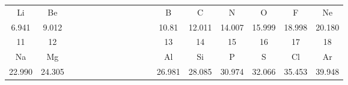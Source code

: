 \begin{tcolorbox}[
        colback=colorrds!5!white,
        colframe=colorrds!35!white,
        coltitle=black,
        fonttitle=\bfseries,
        center title,
        title=Tabla Periódica de los Elementos]
\begin{center}
\begin{tabular}{|c|c|p{17.8mm}*{9}{p{8.98mm}}|c|c|c|c|c|c|}
            Li                                         & Be                                          &  &  &  &  &  &  &  &  &  &  & B                                          & C                                           & N                                         & O             & F                                         & Ne            \\[-2mm]
            \small 6.941                               & \small 9.012\hspace{0.5mm}                  &  &  &  &  &  &  &  &  &  &  & \small 10.81                               & \small 12.011                               & \small 14.007                             & \small 15.999 & \small 18.998                             & \small 20.180 \\[-1mm]\cline{1-2}\cline{13-18}
            \small 11                                  & \small 12                                   &  &  &  &  &  &  &  &  &  &  & \small 13                                  & \small 14                                   & \small 15                                 & \small 16     & \small 17                                 & \small 18     \\[-1mm]
            Na                                         & Mg                                          &  &  &  &  &  &  &  &  &  &  & Al                                         & Si                                          & P                                         & S             & Cl                                        & Ar            \\[-2mm]
            \small \hspace{0.75mm}22.990\hspace{0.8mm} & \small \hspace{0.83mm}24.305\hspace{0.83mm} &  &  &  &  &  &  &  &  &  &  & \small \hspace{0.8mm}26.981\hspace{0.78mm} & \small \hspace{0.95mm}28.085\hspace{0.73mm} & \small \hspace{0.8mm}30.974\hspace{0.8mm} & \small 32.066 & \small \hspace{0.8mm}35.453\hspace{0.8mm} & \small 39.948 \\

\end{tabular}
\end{center}
\end{tcolorbox}
